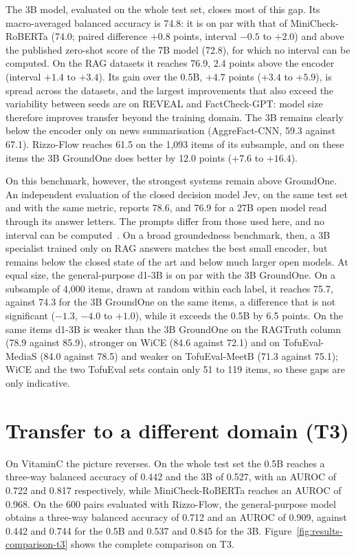 The 3B model, evaluated on the whole test set, closes most of this gap. Its macro-averaged balanced accuracy is 74.8: it
is on par with that of MiniCheck-RoBERTa (74.0; paired difference $+0.8$ points, interval $-0.5$ to $+2.0$) and above
the published zero-shot score of the 7B model (72.8), for which no interval can be computed. On the RAG datasets it
reaches 76.9, 2.4 points above the encoder (interval $+1.4$ to $+3.4$). Its gain over the 0.5B, $+4.7$ points ($+3.4$
to $+5.9$), is spread across the datasets, and the largest improvements that also exceed the variability between seeds are on REVEAL and FactCheck-GPT: model size therefore improves transfer beyond the training domain. The 3B remains clearly below the encoder only on news
summarisation (AggreFact-CNN, 59.3 against 67.1). Rizzo-Flow reaches 61.5 on the 1{,}093 items of its subsample, and on
these items the 3B GroundOne does better by 12.0 points ($+7.6$ to $+16.4$).

On this benchmark, however, the strongest systems remain above GroundOne. An independent evaluation of the closed
decision model Jev, on the same test set and with the same metric, reports 78.6, and 76.9 for a 27B open model read
through its answer letters. The prompts differ from those used here, and no interval can be
computed~\cite{deusser2026jev}. On a broad groundedness benchmark, then, a 3B specialist trained only on RAG answers
matches the best small encoder, but remains below the closed state of the art and below much larger open models. At equal size, the general-purpose d1-3B is on par with the 3B GroundOne. On a subsample of 4{,}000 items, drawn at random within each label, it reaches
75.7, against 74.3 for the 3B GroundOne on the same items, a difference that is not significant ($-1.3$, $-4.0$ to
$+1.0$), while it exceeds the 0.5B by 6.5 points. On the same items d1-3B is weaker than the 3B GroundOne on the RAGTruth column (78.9 against 85.9), stronger on WiCE (84.6 against 72.1) and on TofuEval-MediaS (84.0 against 78.5) and weaker on TofuEval-MeetB (71.3 against 75.1); WiCE and the two TofuEval sets contain only 51 to 119 items, so these gaps are only indicative.

\section{Transfer to a different domain (T3)}
\label{sec:results-t3}

On VitaminC the picture reverses. On the whole test set the 0.5B reaches a three-way balanced accuracy of 0.442 and the
3B of 0.527, with an AUROC of 0.722 and 0.817 respectively, while MiniCheck-RoBERTa reaches an AUROC of 0.968. On the
600 pairs evaluated with Rizzo-Flow, the general-purpose model obtains a three-way balanced accuracy of 0.712 and an
AUROC of 0.909, against 0.442 and 0.744 for the 0.5B and 0.537 and 0.845 for the 3B.
Figure~\ref{fig:results-comparison-t3} shows the complete comparison on T3.

